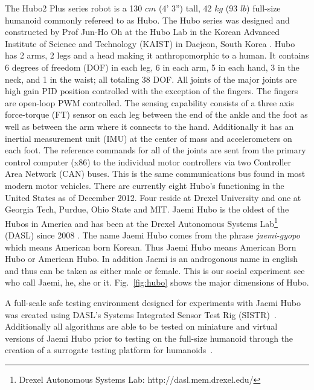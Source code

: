 The Hubo2 Plus series robot is a 130 $cm$ (4' 3'') tall, 42 $kg$ (93 $lb$) full-size humanoid commonly refereed to as Hubo.  
The Hubo series was designed and constructed by Prof Jun-Ho Oh at the Hubo Lab in the Korean Advanced Institute of Science and Technology (KAIST) in Daejeon, South Korea \cite{1573587}.
Hubo has 2 arms, 2 legs and a head making it anthropomorphic to a human.
It contains 6 degrees of freedom (DOF) in each leg, 6 in each arm, 5 in each hand, 3 in the neck, and 1 in the waist; all totaling 38 DOF.
All joints of the major joints are high gain PID position controlled with the exception of the fingers.
The fingers are open-loop PWM controlled.
The sensing capability consists of a three axis force-torque (FT) sensor on each leg between the end of the ankle and the foot as well as between the arm where it connects to the hand.
Additionally it has an inertial measurement unit (IMU) at the center of mass and accelerometers on each foot.
The reference commands for all of the joints are sent from the primary control computer (x86) to the individual motor controllers via two Controller Area Network (CAN) buses.
This is the same communications bus found in most modern motor vehicles.
There are currently eight Hubo's functioning in the United States as of December 2012.
Four reside at Drexel University and one at Georgia Tech, Purdue, Ohio State and MIT.
Jaemi Hubo is the oldest of the Hubos in America and has been at the Drexel Autonomous Systems Lab\footnote{Drexel Autonomous Systems Lab: http://dasl.mem.drexel.edu/} (DASL) since 2008 \cite{jaemiHuboSRM}.
The name Jaemi Hubo comes from the phrase \textit{jaemi-gyopo} which means American born Korean.
Thus Jaemi Hubo means American Born Hubo or American Hubo.  
In addition Jaemi is an androgonous name in english and thus can be taken as either male or female. 
This is our social experiment see who call Jaemi, he, she or it.
Fig.~\ref{fig:hubo} shows the major dimensions of Hubo.

A full-scale safe testing environment designed for experiments with Jaemi Hubo was created using DASL's Systems Integrated Sensor Test Rig (SISTR)~\cite{5686325}.  
Additionally all algorithms are able to be tested on miniature and virtual versions of Jaemi Hubo prior to testing on the full-size humanoid through the creation of a surrogate testing platform for humanoids~\cite{5379582}.

